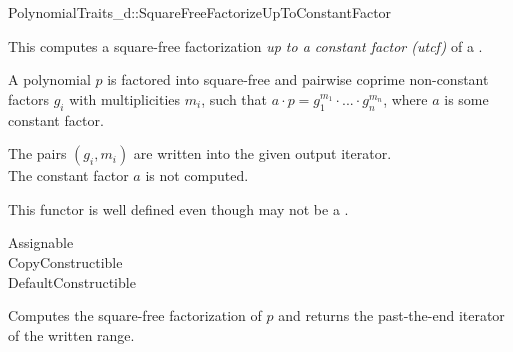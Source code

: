 \begin{ccRefConcept}{PolynomialTraits_d::SquareFreeFactorizeUpToConstantFactor}

\ccDefinition

This  computes a square-free factorization 
{\em up to a constant factor (utcf)} of a 
. 

A polynomial $p$ is factored into square-free and pairwise coprime non-constant
factors $g_i$ with multiplicities $m_i$, such that 
$a  \cdot  p = g_1^{m_1}  \cdot  ...  \cdot  g_n^{m_n}$, where $a$ is some constant factor. 

The pairs $(g_i,m_i)$ are written into the given output iterator.\\
The constant factor $a$ is not computed.
          
This functor is well defined even though 
 may not be a 
.

\ccRefines 

Assignable\\
CopyConstructible\\
DefaultConstructible\\



\ccOperations


{ Computes the square-free factorization of $p$ and returns the 
  past-the-end iterator of the written range. 
}



\ccSeeAlso

\\
\\
\\

\end{ccRefConcept}